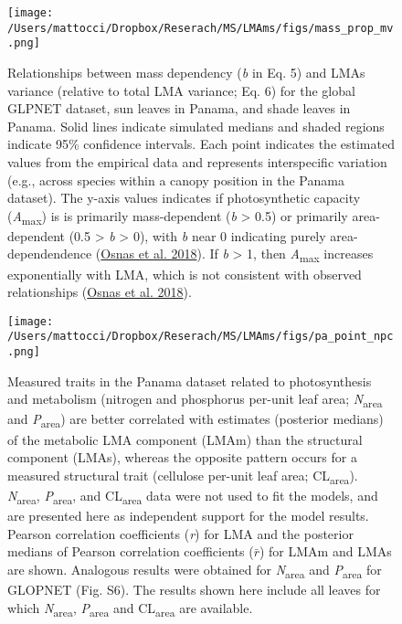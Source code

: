 \documentclass[
  12pt,
  letterpaper,
  DIV=11,
  numbers=noendperiod]{scrartcl}
\begin{document}
\begin{figure}

{\centering \texttt{[image: /Users/mattocci/Dropbox/Reserach/MS/LMAms/figs/mass\_prop\_mv.png]}

}

\caption{\label{fig-mass_prop}Relationships between mass dependency
(\emph{b} in Eq. 5) and LMAs variance (relative to total LMA variance;
Eq. 6) for the global GLPNET dataset, sun leaves in Panama, and shade
leaves in Panama. Solid lines indicate simulated medians and shaded
regions indicate 95\% confidence intervals. Each point indicates the
estimated values from the empirical data and represents interspecific
variation (e.g., across species within a canopy position in the Panama
dataset). The y-axis values indicates if photosynthetic capacity
(\emph{A}\textsubscript{max}) is is primarily mass-dependent (\emph{b}
\textgreater{} 0.5) or primarily area-dependent (0.5 \textgreater{}
\emph{b} \textgreater{} 0), with \emph{b} near 0 indicating purely
area-dependendence (\protect\hyperlink{ref-Osnas2018}{Osnas et al.
2018}). If \emph{b} \textgreater{} 1, then \emph{A}\textsubscript{max}
increases exponentially with LMA, which is not consistent with observed
relationships (\protect\hyperlink{ref-Osnas2018}{Osnas et al. 2018}).}

\end{figure}

\newpage

\begin{figure}

{\centering \texttt{[image: /Users/mattocci/Dropbox/Reserach/MS/LMAms/figs/pa\_point\_npc.png]}

}

\caption{\label{fig-pa_npc}Measured traits in the Panama dataset related
to photosynthesis and metabolism (nitrogen and phosphorus per-unit leaf
area; \emph{N}\textsubscript{area} and \emph{P}\textsubscript{area}) are
better correlated with estimates (posterior medians) of the metabolic
LMA component (LMAm) than the structural component (LMAs), whereas the
opposite pattern occurs for a measured structural trait (cellulose
per-unit leaf area; CL\textsubscript{area}).
\emph{N}\textsubscript{area}, \emph{P}\textsubscript{area}, and
CL\textsubscript{area} data were not used to fit the models, and are
presented here as independent support for the model results. Pearson
correlation coefficients (\emph{r}) for LMA and the posterior medians of
Pearson correlation coefficients (\(\bar{r}\)) for LMAm and LMAs are
shown. Analogous results were obtained for \emph{N}\textsubscript{area}
and \emph{P}\textsubscript{area} for GLOPNET (Fig. S6). The results
shown here include all leaves for which \emph{N}\textsubscript{area},
\emph{P}\textsubscript{area} and CL\textsubscript{area} are available.}

\end{figure}
\end{document}
